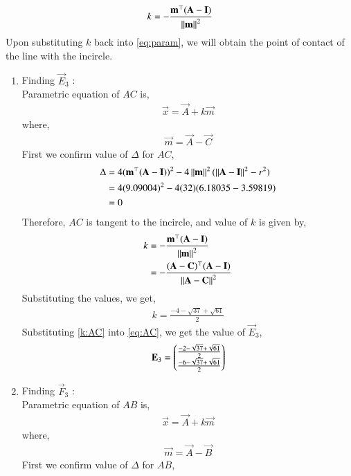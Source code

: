 \documentclass[journal,12pt,twocolumn]{IEEEtran}
\theoremstyle{remark}
\begin{document}
\begin{align}
	k = -\frac{\mathbf{m}^{\top}(\mathbf{A} - \mathbf{I})}{\left\lVert\mathbf{m}\right\rVert^2} \label{eq:k}
\end{align}
Upon substituting $k$ back into \eqref{eq:param}, we will obtain the point of contact of the line with the incircle.
\begin{enumerate}
	\item Finding $\vec{E}_3$ :\\
		Parametric equation of $AC$ is,
		\begin{align}
			\vec{x} = \vec{A} + k\vec{m} \label{eq:AC}
		\end{align}
		where,
		\begin{align}
			\vec{m} = \vec{A} - \vec{C}
		\end{align}	
		First we confirm value of $\Delta$ for $AC$,
		\begin{align}
			\Delta &= 4(\mathbf{m}^{\top}(\mathbf{A}-\mathbf{I}))^2 - 4\left\lVert\mathbf{m}\right\rVert^2(\left\lVert\mathbf{A}-\mathbf{I}\right\rVert^2 - r^2)\\	
			&= 4(9.09004)^2 - 4(32)(6.18035-3.59819) \\
			&= 0
		\end{align}
		Therefore, $AC$ is tangent to the incircle, and value of $k$ is given by, 
		\begin{align}
			k &= -\frac{\mathbf{m}^{\top}(\mathbf{A} - \mathbf{I})}{\left\lVert\mathbf{m}\right\rVert^2} \\
			&= -\frac{(\mathbf{A}-\mathbf{C})^{\top}(\mathbf{A} - \mathbf{I})}{\left\lVert\mathbf{A}-\mathbf{C}\right\rVert^2}
		\end{align}
		Substituting the values, we get,
		\begin{align}
			k = \frac{-4-\sqrt{37}+\sqrt{61}}{2} \label{k:AC} 
		\end{align}
		Substituting \eqref{k:AC} into \eqref{eq:AC}, we get the value of $\vec{E}_3$,
		\begin{align}
			\mathbf{E}_3 = \begin{pmatrix}
				\frac{-2-\sqrt{37}+\sqrt{61}}{2}\\ 
				\frac{-6-\sqrt{37}+\sqrt{61}}{2}
			\end{pmatrix}
		\end{align}
	\item Finding $\vec{F}_3$ :\\
		Parametric equation of $AB$ is,
		\begin{align}
			\vec{x} = \vec{A} + k\vec{m} \label{eq:AB}
		\end{align}
		where,
		\begin{align}
			\vec{m} = \vec{A} - \vec{B}
		\end{align}	
		First we confirm value of $\Delta$ for $AB$,

\end{enumerate}
\end{document}
